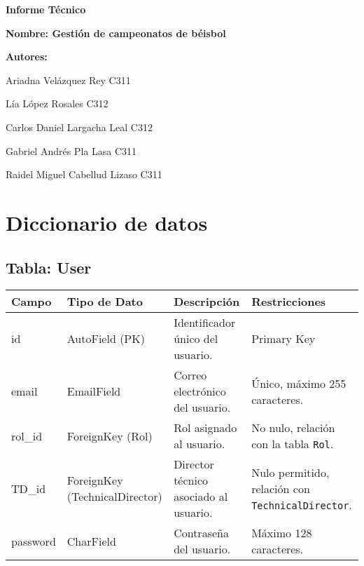 \documentclass{report}
\begin{document}
    \begin{titlepage}
        \centering
        {\bfseries\Huge Informe Técnico \par}
        \vspace*{1cm}
        \vspace*{3cm}
        \vspace*{1cm}
        {\LARGE \textbf{Nombre: Gestión de campeonatos de béisbol} }
        \vfill
        {\bfseries\LARGE Autores: \par}
        {\Large Ariadna Vel\'azquez Rey  C311 \par} 
        {\Large L\'ia L\'opez Rosales  C312 \par} 
        {\Large Carlos Daniel Largacha Leal  C312 \par} 
        {\Large Gabriel Andr\'es Pla Lasa  C311 \par} 
        {\Large Raidel Miguel Cabellud Lizaso C311 \par} 
        \vfill
    \end{titlepage}

    \section*{Diccionario de datos}    
    \subsection*{Tabla: User}
    \begin{tabular}{|>{\raggedright\arraybackslash}p{3cm}|>{\raggedright\arraybackslash}p{3cm}|>{\raggedright\arraybackslash}p{6cm}|>{\raggedright\arraybackslash}p{4cm}|}
        \hline
        \textbf{Campo} & \textbf{Tipo de Dato} & \textbf{Descripción} & \textbf{Restricciones} \\
        \hline
        id & AutoField (PK) & Identificador único del usuario. & Primary Key \\
        \hline
        email & EmailField & Correo electrónico del usuario. & Único, máximo 255 caracteres. \\
        \hline
        rol\_id & ForeignKey (Rol) & Rol asignado al usuario. & No nulo, relación con la tabla \texttt{Rol}. \\
        \hline
        TD\_id & ForeignKey (TechnicalDirector) & Director técnico asociado al usuario. & Nulo permitido, relación con \texttt{TechnicalDirector}. \\
        \hline
        password & CharField & Contraseña del usuario. & Máximo 128 caracteres. \\
        \hline
    \end{tabular}
    
\end{document}
